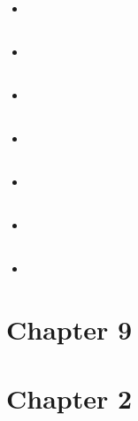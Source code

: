 \documentclass{article}
\begin{document}
    \subsection{}
    \begin{itemize}
        \item 
    \end{itemize}

    \subsection{}
    \begin{itemize}
        \item 
    \end{itemize}

    \subsection{}
    \begin{itemize}
        \item 
    \end{itemize}

    \subsection{}
    \begin{itemize}
        \item 
    \end{itemize}

    \subsection{}
    \begin{itemize}
        \item 
    \end{itemize}

    \subsection{}
    \begin{itemize}
        \item 
    \end{itemize}

    \subsection{}
    \begin{itemize}
        \item 
    \end{itemize}

    \section{Chapter 9}
    \section{Chapter 2}
\end{document}
